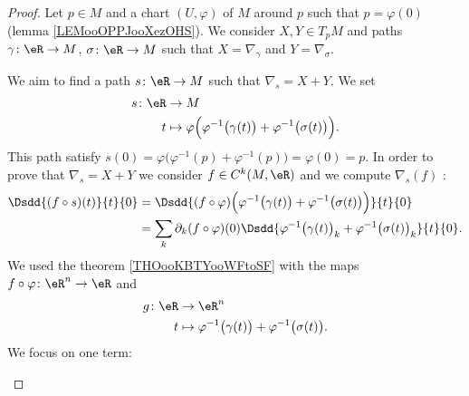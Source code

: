 \begin{proof}
	Let \( p\in M\) and a chart \( (U,\varphi)\) of \( M\) around \( p\) such that \( p=\varphi(0)\) (lemma \ref{LEMooOPPJooXezOHS}). We consider \( X,Y\in T_pM\) and paths \( \gamma\colon \eR\to M\), \( \sigma\colon \eR\to M\) such that \( X=\nabla_{\gamma}\) and \( Y=\nabla_{\sigma}\).

	\begin{subproof}
		\spitem[Sum]


		We aim to find a path \( s\colon \eR\to M\) such that \( \nabla_s=X+Y\). We set
		\begin{equation}        \label{EQooYNAOooKkKmxo}
			\begin{aligned}
				s\colon \eR & \to M                                                                                           \\
				t           & \mapsto \varphi\Big( \varphi^{-1}\big( \gamma(t) \big)+\varphi^{-1}\big( \sigma(t) \big) \Big).
			\end{aligned}
		\end{equation}
		This path satisfy \( s(0)=\varphi\Big( \varphi^{-1}(p)+\varphi^{-1}(p) \Big)=\varphi(0)=p\). In order to prove that \( \nabla_s=X+Y\) we consider \( f\in C^k(M,\eR)\) and we compute \( \nabla_s(f)\) :
		\begin{subequations}        \label{SUBEQSooKOGNooGISCax}
			\begin{align}
				\Dsdd{ (f\circ s)(t) }{t}{0} & =\Dsdd{ (f\circ\varphi)\Big( \varphi^{-1}\big( \gamma(t) \big)+\varphi^{-1}\big( \sigma(t) \big) \Big) }{t}{0}              \\
				                             & =\sum_k\partial_k(f\circ \varphi)(0)\Dsdd{ \varphi^{-1}\big( \gamma(t) \big)_k+\varphi^{-1}\big( \sigma(t) \big)_k }{t}{0}.
			\end{align}
		\end{subequations}
		We used the theorem \ref{THOooKBTYooWFtoSF} with the maps \( f\circ \varphi\colon \eR^n\to \eR\) and
		\begin{equation}
			\begin{aligned}
				g\colon \eR & \to \eR^n                                                                    \\
				t           & \mapsto \varphi^{-1}\big( \gamma(t) \big)+\varphi^{-1}\big( \sigma(t) \big).
			\end{aligned}
		\end{equation}
		We focus on one term:
		\begin{subequations}

\end{subequations}
\end{subproof}
\end{proof}
